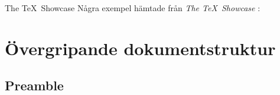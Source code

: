 \documentclass{beamer} %
\begin{document}
\begin{frame}{\insertsubsectionhead}{The \TeX\ Showcase}
  Några exempel hämtade från \emph{The \TeX\ Showcase} \citep{TUG2012tsc}:
	\begin{figure}
		\hfill
		\hfill
		\hfill
	\end{figure}
\end{frame}


\section[Dokumentstruktur]{Övergripande dokumentstruktur}

\subsection{Preamble}
\end{document}
